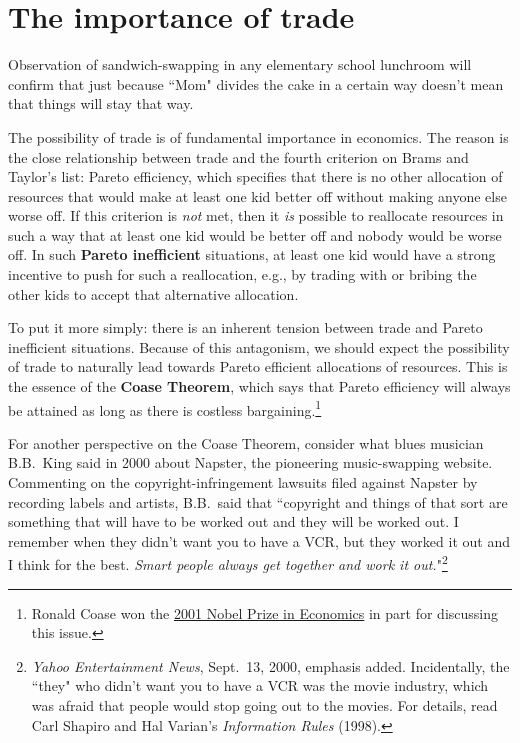 \section{The importance of trade}\label{importanceoftrade}

Observation of sandwich-swapping in any elementary school lunchroom will confirm that just because ``Mom" divides the cake in a certain way doesn't mean that things will stay that way.

The possibility of trade is of fundamental importance in economics. The reason is the close relationship between trade and the fourth criterion on Brams and Taylor's list: Pareto efficiency, which specifies that there is no other allocation of resources that would make at least one kid better off without making anyone else worse off. If this criterion is \emph{not} met, then it \emph{is} possible to reallocate resources in such a way that at least one kid would be better off and nobody would be worse off. In such \textbf{Pareto inefficient} situations, at least one kid would have a strong incentive to push for such a reallocation, e.g., by trading with or bribing the other kids to accept that alternative allocation.

To put it more simply: there is an inherent tension between trade and Pareto inefficient situations. Because of this antagonism, we should expect the possibility of trade to naturally lead towards Pareto efficient allocations of resources. This is the essence of the \textbf{Coase Theorem}, which says that Pareto efficiency will always be attained as long as there is costless bargaining.\footnote{Ronald Coase won the \href{http://nobelprize.org/nobel_prizes/economics/laureates/2001/}{2001 Nobel Prize in Economics} in part for discussing this issue.}

For another perspective on the Coase Theorem, consider what blues musician B.B.\ King said in 2000 about Napster, the pioneering music-swapping website. Commenting on the copyright-infringement lawsuits filed against Napster by recording labels and artists, B.B.\ said that ``copyright and things of that sort are something that will have to be worked out and they will be worked out. I remember when they didn't want you to have a VCR, but they worked it out and I think for the best. \emph{Smart people always get together and work it out.}"\footnote{\emph{Yahoo Entertainment News}, Sept.\ 13, 2000, emphasis added. Incidentally, the ``they" who didn't want you to have a VCR was the movie industry, which was afraid that people would stop going out to the movies. For details, read Carl Shapiro and Hal Varian's \emph{Information Rules} (1998).}

